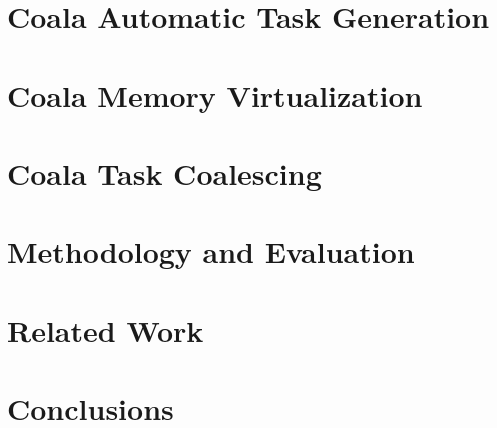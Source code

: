 \documentclass[sigplan,10pt,review,anonymous]{acmart}
\newcommand{\sys}{Coala\xspace}
\begin{document}


\section{\sys Automatic Task Generation}
\label{sec:compiler}



\section{\sys Memory Virtualization}
\label{sec:memory_virtulaization}



\section{\sys Task Coalescing}
\label{sec:task_coalescing}




%

\section{Methodology and Evaluation}
\label{sec:methodology_evaluation}



\section{Related Work}
\label{sec:related_work}



\section{Conclusions}
\label{sec:conclusions}




%

\end{document}
